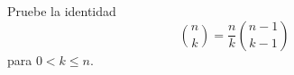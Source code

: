 \begin{statement}{10}
  Pruebe la identidad
  \[
    \binom{n}{k} = \frac{n}{k} \binom{n - 1}{k - 1}
  \]
  para $0 < k \leq n$.
\end{statement}